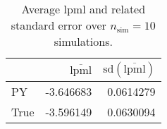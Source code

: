 \begin{table}[H]

\caption{Average lpml and related standard error over $n_{\text{sim}} = 10$ simulations.}
\centering
\begin{tabular}[t]{lrr}
\toprule
  & $\overbar{\text{lpml}}$ & $\text{sd}(\overbar{\text{lpml}})$\\
\midrule
PY & -3.646683 & 0.0614279\\
True & -3.596149 & 0.0630094\\
\bottomrule
\end{tabular}
\end{table}
